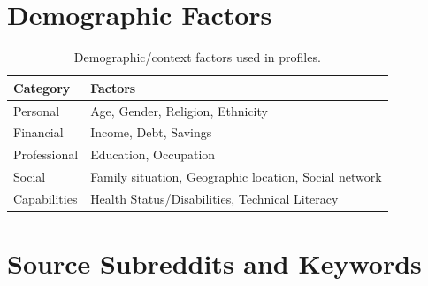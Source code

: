 \section{Demographic Factors}
\label{demographic}
\begin{table}[!]
\centering
\small
\caption{Demographic/context factors used in profiles.}
\label{tab:context_factors}

\begingroup
\renewcommand{\arraystretch}{1.1}
\begin{tabular}{@{} ll @{}}
\toprule
\textbf{Category} & \textbf{Factors} \\
\midrule
Personal & Age, Gender, Religion, Ethnicity \\
Financial & Income, Debt, Savings \\
Professional & Education, Occupation \\
Social & Family situation, Geographic location, Social network \\
Capabilities & Health Status/Disabilities, Technical Literacy \\
\bottomrule
\end{tabular}
\endgroup
\end{table}
\newpage

\section{Source Subreddits and Keywords}
\label{subreddits-keywords}

